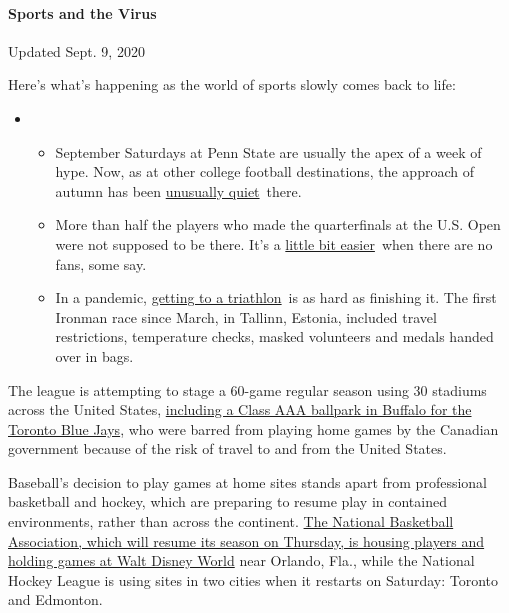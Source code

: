 \hypertarget{sports-and-the-virus}{%
\paragraph{Sports and the Virus}\label{sports-and-the-virus}}

Updated Sept. 9, 2020

Here's what's happening as the world of sports slowly comes back to
life:

\begin{itemize}
\item
  \begin{itemize}
  \tightlist
  \item
    September Saturdays at Penn State are usually the apex of a week of
    hype. Now, as at other college football destinations, the approach
    of autumn has been
    \href{https://www.nytimes3xbfgragh.onion/2020/09/09/sports/penn-state-college-football-canceled.html?action=click\&pgtype=Article\&state=default\&region=MAIN_CONTENT_2\&context=storylines_keepup}{unusually
    quiet}~there.
  \item
    More than half the players who made the quarterfinals at the U.S.
    Open were not supposed to be there. It's a
    \href{https://www.nytimes3xbfgragh.onion/2020/09/09/sports/us-open-crowd.html?action=click\&pgtype=Article\&state=default\&region=MAIN_CONTENT_2\&context=storylines_keepup}{little
    bit easier}~when there are no fans, some say.
  \item
    In a pandemic,
    \href{https://www.nytimes3xbfgragh.onion/2020/09/08/sports/ironman-tallinn-triathlon-pandemic.html?action=click\&pgtype=Article\&state=default\&region=MAIN_CONTENT_2\&context=storylines_keepup}{getting
    to a triathlon}~is as hard as finishing it. The first Ironman race
    since March, in Tallinn, Estonia, included travel restrictions,
    temperature checks, masked volunteers and medals handed over in
    bags.
  \end{itemize}
\end{itemize}

The league is attempting to stage a 60-game regular season using 30
stadiums across the United States,
\href{https://www.nytimes3xbfgragh.onion/2020/07/24/sports/baseball/blue-jays-buffalo.html}{including
a Class AAA ballpark in Buffalo for the Toronto Blue Jays}, who were
barred from playing home games by the Canadian government because of the
risk of travel to and from the United States.

Baseball's decision to play games at home sites stands apart from
professional basketball and hockey, which are preparing to resume play
in contained environments, rather than across the continent.
\href{https://www.nytimes3xbfgragh.onion/2020/07/27/sports/basketball/coronavirus-nba-season-bubble-disney-world.html}{The
National Basketball Association, which will resume its season on
Thursday, is housing players and holding games at Walt Disney World}
near Orlando, Fla., while the National Hockey League is using sites in
two cities when it restarts on Saturday: Toronto and Edmonton.

